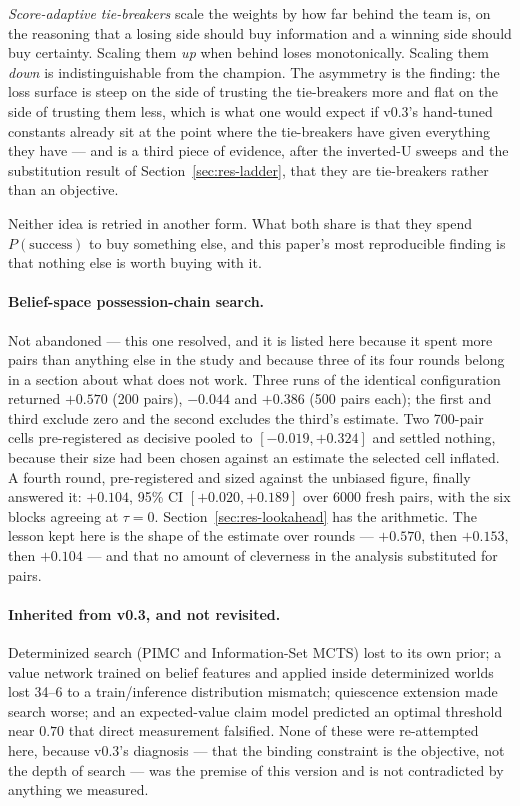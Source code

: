 \documentclass[11pt,a4paper]{article}
\begin{document}
\emph{Score-adaptive tie-breakers} scale the weights by how far behind the team
is, on the reasoning that a losing side should buy information and a winning side
should buy certainty. Scaling them \emph{up} when behind loses monotonically.
Scaling them \emph{down} is indistinguishable from the champion. The asymmetry is
the finding: the loss surface is steep on the side of trusting the tie-breakers
more and flat on the side of trusting them less, which is what one would expect
if v0.3's hand-tuned constants already sit at the point where the tie-breakers
have given everything they have --- and is a third piece of evidence, after the
inverted-U sweeps and the substitution result of Section~\ref{sec:res-ladder},
that they are tie-breakers rather than an objective.

Neither idea is retried in another form. What both share is that they spend
$P(\text{success})$ to buy something else, and this paper's most reproducible
finding is that nothing else is worth buying with it.

\paragraph{Belief-space possession-chain search.} Not abandoned --- this one
resolved, and it is listed here because it spent more pairs than anything else
in the study and because three of its four rounds belong in a section about
what does not work. Three runs of the identical configuration returned $+0.570$
(200 pairs), $-0.044$ and $+0.386$ (500 pairs each); the first and third exclude
zero and the second excludes the third's estimate. Two 700-pair cells
pre-registered as decisive pooled to $[-0.019, +0.324]$ and settled nothing,
because their size had been chosen against an estimate the selected cell
inflated. A fourth round, pre-registered and sized against the unbiased figure,
finally answered it: $+0.104$, 95\% CI $[+0.020, +0.189]$ over 6000 fresh pairs,
with the six blocks agreeing at $\tau = 0$. Section~\ref{sec:res-lookahead} has
the arithmetic. The lesson kept here is the shape of the estimate over rounds
--- $+0.570$, then $+0.153$, then $+0.104$ --- and that no amount of cleverness
in the analysis substituted for pairs.

\paragraph{Inherited from v0.3, and not revisited.} Determinized search (PIMC
and Information-Set MCTS) lost to its own prior; a value network trained on
belief features and applied inside determinized worlds lost 34--6 to a
train/inference distribution mismatch; quiescence extension made search worse;
and an expected-value claim model predicted an optimal threshold near $0.70$
that direct measurement falsified. None of these were re-attempted here, because
v0.3's diagnosis --- that the binding constraint is the objective, not the depth
of search --- was the premise of this version and is not contradicted by
anything we measured.
\end{document}
